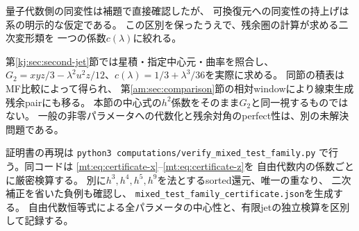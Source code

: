量子代数側の同変性は補題で直接確認したが、
可換復元への同変性の持上げは系の明示的な仮定である。
この区別を保ったうえで、残余圏の計算が求める二次変形類を
一つの係数$c(\lambda)$に絞れる。

第\ref{kj:sec:second-jet}節では星積・指定中心元・曲率を照合し、
$G_2=xyz/3-\lambda^2u^2z/12$、$c(\lambda)=1/3+\lambda^3/36$を実際に求める。
同節の積表はMF比較によって得られ、
第\ref{am:sec:comparison}節の相対windowにより線束生成残余pairにも移る。
本節の中心式の$h^2$係数をそのまま$G_2$と同一視するものではない。
一般の非零パラメータへの代数化と残余対角のperfect性は、別の未解決問題である。

証明書の再現は
\texttt{python3 computations/verify\_mixed\_test\_family.py}
で行う。同コードは
\eqref{mt:eq:certificate-x}--\eqref{mt:eq:certificate-z}を
自由代数内の係数ごとに厳密検算する。
別に$h^3,h^4,h^5,h^9$を法とするsorted還元、唯一の重なり、
二次補正を省いた負例も確認し、
\texttt{mixed\_test\_family\_certificate.json}を生成する。
自由代数恒等式による全パラメータの中心性と、有限jetの独立検算を区別して記録する。
